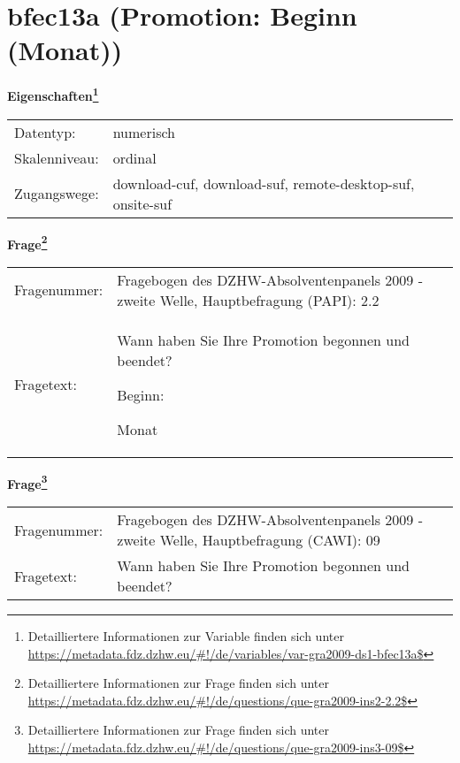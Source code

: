 
    \setcounter{footnote}{0}

    \vspace*{-1.8cm}
	\section{bfec13a (Promotion: Beginn (Monat))}
	\label{section:bfec13a}



    \vspace*{0.5cm}
    \noindent\textbf{Eigenschaften\footnote{Detailliertere Informationen zur Variable finden sich unter
		\url{https://metadata.fdz.dzhw.eu/\#!/de/variables/var-gra2009-ds1-bfec13a$}}}\\
	\begin{tabularx}{\hsize}{@{}lX}
	Datentyp: & numerisch \\
	Skalenniveau: & ordinal \\
	Zugangswege: &
	  download-cuf, 
	  download-suf, 
	  remote-desktop-suf, 
	  onsite-suf
 \\
    \end{tabularx}



				\vspace*{0.5cm}
                \noindent\textbf{Frage\footnote{Detailliertere Informationen zur Frage finden sich unter
		              \url{https://metadata.fdz.dzhw.eu/\#!/de/questions/que-gra2009-ins2-2.2$}}}\\
				\begin{tabularx}{\hsize}{@{}lX}
					Fragenummer: &
					  Fragebogen des DZHW-Absolventenpanels 2009 - zweite Welle, Hauptbefragung (PAPI):
					  2.2
 \\
					Fragetext: & Wann haben Sie Ihre Promotion begonnen und beendet?\par  Beginn:\par  Monat \\
				\end{tabularx}
				\vspace*{0.5cm}
                \noindent\textbf{Frage\footnote{Detailliertere Informationen zur Frage finden sich unter
		              \url{https://metadata.fdz.dzhw.eu/\#!/de/questions/que-gra2009-ins3-09$}}}\\
				\begin{tabularx}{\hsize}{@{}lX}
					Fragenummer: &
					  Fragebogen des DZHW-Absolventenpanels 2009 - zweite Welle, Hauptbefragung (CAWI):
					  09
 \\
					Fragetext: & Wann haben Sie Ihre Promotion begonnen und beendet? \\
				\end{tabularx}






